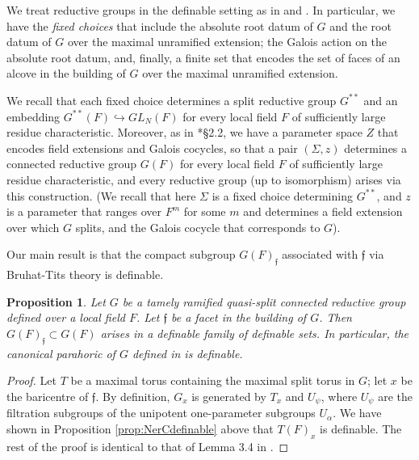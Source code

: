 \documentclass{amsart}
\newcommand{\ff}{{\mathfrak f}}
\theoremstyle{plain}
\newtheorem{prop}[thm]{Proposition}
\theoremstyle{definition}
\begin{document}
We treat reductive groups in the definable setting as in \cite{hales:transfert} and \cite{CGH-2}.
In particular, we have the \emph{fixed choices} that include the absolute root datum of $G$ and the root datum of $G$ over the maximal unramified extension; the Galois action on the absolute root datum, and, finally,  a finite set that encodes the set of faces of an alcove in the building of $G$ over the maximal unramified extension.

We recall that each  fixed choice determines  a split reductive group $G^{\ast\ast}$ and an embedding 
$G^{\ast\ast}(F)\hookrightarrow GL_N(F)$ for every local field $F$ of sufficiently large residue characteristic.  
Moreover, as in \cite{hales:transfert}*{\S 2.2}, we  have a parameter space $Z$ that encodes field extensions and Galois cocycles, so that a pair 
$(\Sigma, z)$ determines a connected reductive group $G(F)$ for every local field $F$ of sufficiently large residue characteristic, and every reductive group (up to isomorphism)  arises via this construction. 
(We recall that here $\Sigma$ is a fixed choice determining $G^{\ast\ast}$, and $z$ is a parameter that ranges over $F^m$ for some $m$ and determines a field extension over which $G$ splits, and the Galois cocycle that corresponds to $G$). 

Our main result is that 
the compact subgroup $G(F)_\ff$ associated with $\ff$ via Bruhat-Tits theory is definable.  


\begin{prop} Let $G$ be a tamely ramified quasi-split connected reductive group defined over a local field $F$. Let $\ff$ be a facet in the building of $G$. 
Then $G(F)_\ff\subset G(F)$ arises in a definable family of definable sets. 
In particular, the canonical parahoric of $G$ defined in \cite{gross:motive} is definable. 
\end{prop}

\begin{proof} Let $T$ be a maximal torus containing the maximal split torus in $G$; let $x$ be the baricentre of $\ff$.
By definition, $G_x$ is generated by $T_x$ and $U_\psi$, where $U_\psi$ are the filtration subgroups of the unipotent one-parameter subgroups $U_{\alpha}$. 
We have shown in Proposition \ref{prop:NerCdefinable} above that  $T(F)_x$ is definable. The rest of the proof is identical to that of Lemma 3.4 in \cite{CGH-2}.  
\end{proof} 
\end{document}
